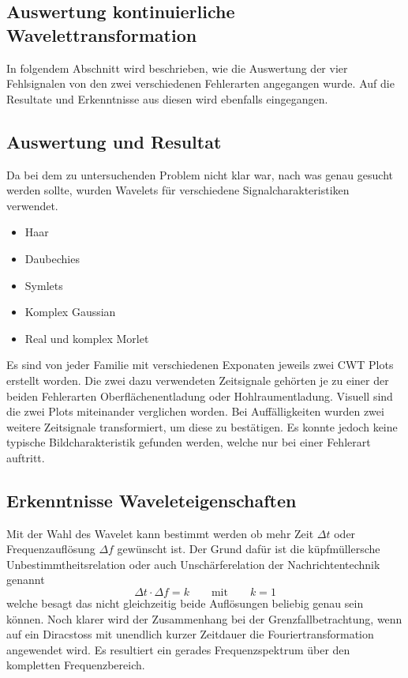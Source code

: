 \begin{refsection}
\section{Auswertung kontinuierliche Wavelettransformation}
In folgendem Abschnitt wird beschrieben, wie die Auswertung der vier Fehlsignalen von den zwei verschiedenen Fehlerarten angegangen wurde. Auf die Resultate und Erkenntnisse aus diesen wird ebenfalls eingegangen. 
\subsection{Auswertung und Resultat}
Da bei dem zu untersuchenden Problem nicht klar war, nach was genau gesucht werden sollte, wurden Wavelets für verschiedene Signalcharakteristiken verwendet.
\begin{itemize}
	\item Haar
	\item Daubechies 
	\item Symlets
	\item Komplex Gaussian
	\item Real und komplex Morlet
\end{itemize}
Es sind von jeder Familie mit verschiedenen Exponaten jeweils zwei CWT Plots erstellt worden. 
Die zwei dazu verwendeten Zeitsignale gehörten je zu einer der beiden Fehlerarten Oberflächenentladung oder Hohlraumentladung.
Visuell sind die zwei Plots miteinander verglichen worden.
Bei Auffälligkeiten wurden zwei weitere Zeitsignale transformiert, um diese zu bestätigen.
Es konnte jedoch keine typische Bildcharakteristik gefunden werden, welche nur bei einer Fehlerart auftritt.

\subsection{Erkenntnisse Waveleteigenschaften}
Mit der Wahl des Wavelet kann bestimmt werden ob mehr Zeit $\Delta t$ oder Frequenzauflösung $\Delta f$ gewünscht ist. 
Der Grund dafür ist die küpfmüllersche Unbestimmtheitsrelation oder auch Unschärferelation der Nachrichtentechnik genannt
\begin{equation}
\Delta t \cdot \Delta f = k
\qquad\text{mit}\qquad
k = 1
\end{equation}
welche besagt das nicht gleichzeitig beide Auflösungen beliebig genau sein können.
Noch klarer wird der Zusammenhang bei der Grenzfallbetrachtung, wenn auf ein Diracstoss mit unendlich kurzer Zeitdauer die Fouriertransformation angewendet wird.
Es resultiert ein gerades Frequenzspektrum über den kompletten Frequenzbereich.


\end{refsection}
